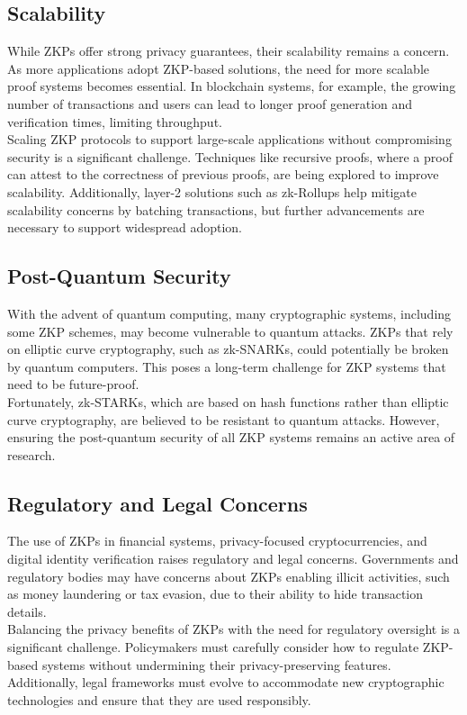 \subsection{Scalability}

While ZKPs offer strong privacy guarantees, their scalability remains a concern. As more applications adopt ZKP-based solutions, the need for more scalable proof systems becomes essential. In blockchain systems, for example, the growing number of transactions and users can lead to longer proof generation and verification times, limiting throughput.
\\
Scaling ZKP protocols to support large-scale applications without compromising security is a significant challenge. Techniques like recursive proofs, where a proof can attest to the correctness of previous proofs, are being explored to improve scalability. Additionally, layer-2 solutions such as zk-Rollups help mitigate scalability concerns by batching transactions, but further advancements are necessary to support widespread adoption.

\subsection{Post-Quantum Security}

With the advent of quantum computing, many cryptographic systems, including some ZKP schemes, may become vulnerable to quantum attacks. ZKPs that rely on elliptic curve cryptography, such as zk-SNARKs, could potentially be broken by quantum computers. This poses a long-term challenge for ZKP systems that need to be future-proof.
\\
Fortunately, zk-STARKs, which are based on hash functions rather than elliptic curve cryptography, are believed to be resistant to quantum attacks. However, ensuring the post-quantum security of all ZKP systems remains an active area of research.

\subsection{Regulatory and Legal Concerns}

The use of ZKPs in financial systems, privacy-focused cryptocurrencies, and digital identity verification raises regulatory and legal concerns. Governments and regulatory bodies may have concerns about ZKPs enabling illicit activities, such as money laundering or tax evasion, due to their ability to hide transaction details.
\\
Balancing the privacy benefits of ZKPs with the need for regulatory oversight is a significant challenge. Policymakers must carefully consider how to regulate ZKP-based systems without undermining their privacy-preserving features. Additionally, legal frameworks must evolve to accommodate new cryptographic technologies and ensure that they are used responsibly.